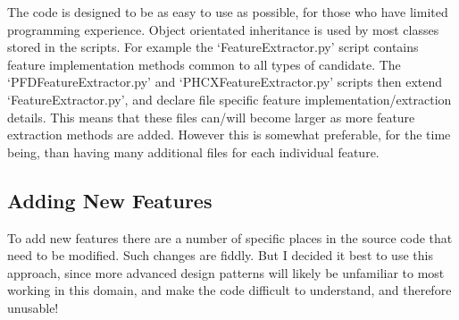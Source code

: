 \documentclass[twoside,a4paper]{refart}
\begin{document}
The code is designed to be as easy to use as possible, for those who have limited programming experience. Object orientated inheritance is used by most classes stored in the scripts. For example the `FeatureExtractor.py' script contains feature implementation methods common to all types of candidate. The `PFDFeatureExtractor.py' and `PHCXFeatureExtractor.py' scripts then extend `FeatureExtractor.py', and declare file specific feature implementation/extraction details. This means that these files can/will become larger as more feature extraction methods are added. However this is somewhat preferable, for the time being, than having many additional files for each individual feature. 
\subsection{Adding New Features}
To add new features there are a number of specific places in the source code that need to be modified. Such changes are fiddly. But I decided it best to use this approach, since more advanced design patterns will likely be unfamiliar to most working in this domain, and make the code difficult to understand, and therefore unusable!
\end{document}
